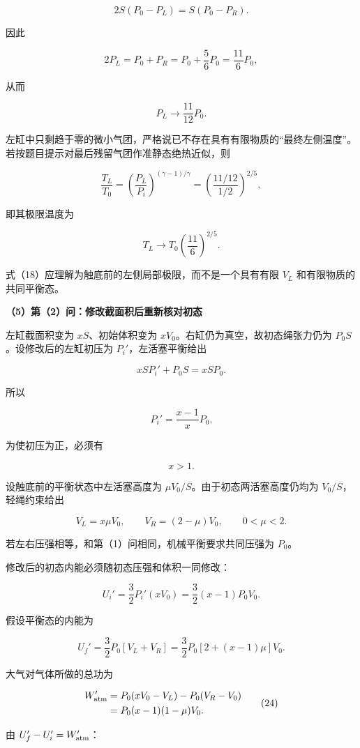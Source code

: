 \documentclass[12pt,a4paper,UTF8]{ctexart}
\begin{document}
\[
2S(P_0-P_L)=S(P_0-P_R).
\]

因此

\[
2P_L=P_0+P_R
=P_0+\frac56P_0
=\frac{11}{6}P_0,
\]

从而

\[
\boxed{P_L\to\frac{11}{12}P_0}.
\tag{17}
\]

左缸中只剩趋于零的微小气团，严格说已不存在具有有限物质的``最终左侧温度''。若按题目提示对最后残留气团作准静态绝热近似，则

\[
\frac{T_L}{T_0}
=\left(\frac{P_L}{P_i}\right)^{(\gamma-1)/\gamma}
=\left(\frac{11/12}{1/2}\right)^{2/5},
\]

即其极限温度为

\[
\boxed{T_L\to T_0\left(\frac{11}{6}\right)^{2/5}}.
\tag{18}
\]

式（18）应理解为触底前的左侧局部极限，而不是一个具有有限 \(V_L\)
和有限物质的共同平衡态。

\textbf{（5）第（2）问：修改截面积后重新核对初态}

左缸截面积变为 \(xS\)、初始体积变为
\(xV_0\)。右缸仍为真空，故初态绳张力仍为 \(P_0S\)。设修改后的左缸初压为
\(P_i'\)，左活塞平衡给出

\[
xSP_i'+P_0S=xSP_0.
\]

所以

\[
\boxed{P_i'=\frac{x-1}{x}P_0}.
\tag{19}
\]

为使初压为正，必须有

\[
x>1.
\tag{20}
\]

设触底前的平衡状态中左活塞高度为 \(\mu V_0/S\)。由于初态两活塞高度仍均为
\(V_0/S\)，轻绳约束给出

\[
V_L=x\mu V_0,
\qquad
V_R=(2-\mu)V_0,
\qquad 0<\mu<2.
\tag{21}
\]

若左右压强相等，和第（1）问相同，机械平衡要求共同压强为 \(P_0\)。

修改后的初态内能必须随初态压强和体积一同修改：

\[
U_i'
=\frac32P_i'(xV_0)
=\frac32(x-1)P_0V_0.
\tag{22}
\]

假设平衡态的内能为

\[
U_f'=\frac32P_0[V_L+V_R]
=\frac32P_0[2+(x-1)\mu]V_0.
\tag{23}
\]

大气对气体所做的总功为

\[
\begin{aligned}
W_{\rm atm}'
&=P_0(xV_0-V_L)-P_0(V_R-V_0)\\
&=P_0(x-1)(1-\mu)V_0.
\end{aligned}
\tag{24}
\]

由 \(U_f'-U_i'=W_{\rm atm}'\)：
\end{document}
